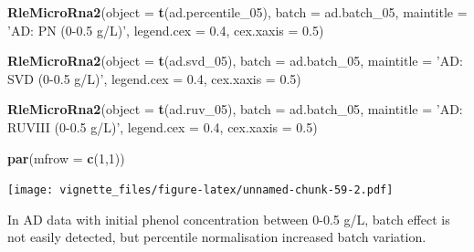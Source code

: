 \documentclass[]{book}
\newenvironment{Shaded}{\begin{snugshade}}{\end{snugshade}}
\newcommand{\KeywordTok}[1]{\textcolor[rgb]{0.13,0.29,0.53}{\textbf{#1}}}
\newcommand{\DataTypeTok}[1]{\textcolor[rgb]{0.13,0.29,0.53}{#1}}
\newcommand{\DecValTok}[1]{\textcolor[rgb]{0.00,0.00,0.81}{#1}}
\newcommand{\FloatTok}[1]{\textcolor[rgb]{0.00,0.00,0.81}{#1}}
\newcommand{\StringTok}[1]{\textcolor[rgb]{0.31,0.60,0.02}{#1}}
\newcommand{\NormalTok}[1]{#1}
\begin{document}
\begin{Shaded}
\begin{Highlighting}[]
\KeywordTok{RleMicroRna2}\NormalTok{(}\DataTypeTok{object =} \KeywordTok{t}\NormalTok{(ad.percentile_}\DecValTok{05}\NormalTok{), }\DataTypeTok{batch =}\NormalTok{ ad.batch_}\DecValTok{05}\NormalTok{, }
             \DataTypeTok{maintitle =} \StringTok{'AD: PN (0-0.5 g/L)'}\NormalTok{, }\DataTypeTok{legend.cex =} \FloatTok{0.4}\NormalTok{, }
             \DataTypeTok{cex.xaxis =} \FloatTok{0.5}\NormalTok{)}

\KeywordTok{RleMicroRna2}\NormalTok{(}\DataTypeTok{object =} \KeywordTok{t}\NormalTok{(ad.svd_}\DecValTok{05}\NormalTok{), }\DataTypeTok{batch =}\NormalTok{ ad.batch_}\DecValTok{05}\NormalTok{, }
             \DataTypeTok{maintitle =} \StringTok{'AD: SVD (0-0.5 g/L)'}\NormalTok{, }\DataTypeTok{legend.cex =} \FloatTok{0.4}\NormalTok{, }
             \DataTypeTok{cex.xaxis =} \FloatTok{0.5}\NormalTok{)}

\KeywordTok{RleMicroRna2}\NormalTok{(}\DataTypeTok{object =} \KeywordTok{t}\NormalTok{(ad.ruv_}\DecValTok{05}\NormalTok{), }\DataTypeTok{batch =}\NormalTok{ ad.batch_}\DecValTok{05}\NormalTok{, }
             \DataTypeTok{maintitle =} \StringTok{'AD: RUVIII (0-0.5 g/L)'}\NormalTok{, }\DataTypeTok{legend.cex =} \FloatTok{0.4}\NormalTok{, }
             \DataTypeTok{cex.xaxis =} \FloatTok{0.5}\NormalTok{)}

\KeywordTok{par}\NormalTok{(}\DataTypeTok{mfrow =} \KeywordTok{c}\NormalTok{(}\DecValTok{1}\NormalTok{,}\DecValTok{1}\NormalTok{))}
\end{Highlighting}
\end{Shaded}

\texttt{[image: vignette\_files/figure-latex/unnamed-chunk-59-2.pdf]}

In AD data with initial phenol concentration between 0-0.5 g/L, batch
effect is not easily detected, but percentile normalisation increased
batch variation.
\end{document}
